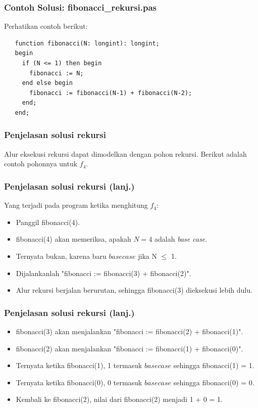 \begin{frame}[fragile]
\frametitle{Contoh Solusi: fibonacci\_rekursi.pas}
Perhatikan contoh berikut:
\begin{lstlisting}
   function fibonacci(N: longint): longint;
   begin
     if (N <= 1) then begin
       fibonacci := N;
     end else begin
       fibonacci := fibonacci(N-1) + fibonacci(N-2);
     end;
   end;
\end{lstlisting}
\end{frame}

\begin{frame}[fragile]
\frametitle{Penjelasan solusi rekursi}
Alur eksekusi rekursi dapat dimodelkan dengan pohon rekursi. Berikut adalah contoh pohonnya untuk $f_4$.
\end{frame}

\begin{frame}
\frametitle{Penjelasan solusi rekursi (lanj.)}
Yang terjadi pada program ketika menghitung $f_4$:
\begin {itemize}
  \item Panggil fibonacci(4).
  \item fibonacci(4) akan memeriksa, apakah $N=4$ adalah \textit{base case}.
  \item Ternyata bukan, karena baru $base case$ jika N $\le$ 1.
  \item Dijalankanlah "fibonacci := fibonacci(3) + fibonacci(2)".
  \item Alur rekursi berjalan berurutan, sehingga fibonacci(3) dieksekusi lebih dulu.
\end{itemize}
\end{frame}

\begin{frame}
\frametitle{Penjelasan solusi rekursi (lanj.)}
\begin{itemize}
  \item fibonacci(3) akan menjalankan "fibonacci := fibonacci(2) + fibonacci(1)".
  \item fibonacci(2) akan menjalankan "fibonacci := fibonacci(1) + fibonacci(0)".
  \item Ternyata ketika fibonacci(1), 1 termasuk $base case$ sehingga fibonacci(1) = 1.
  \item Ternyata ketika fibonacci(0), 0 termasuk $base case$ sehingga fibonacci(0) = 0.
  \item Kembali ke fibonacci(2), nilai dari fibonacci(2) menjadi 1 + 0 = 1.
\end{itemize}
\end{frame}

